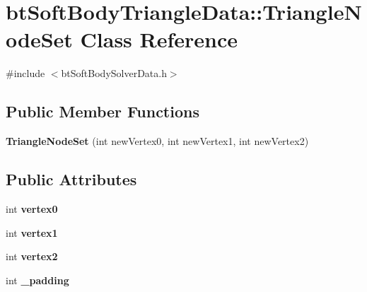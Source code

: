 \hypertarget{classbt_soft_body_triangle_data_1_1_triangle_node_set}{\section{bt\+Soft\+Body\+Triangle\+Data\+:\+:Triangle\+Node\+Set Class Reference}
\label{classbt_soft_body_triangle_data_1_1_triangle_node_set}
}


{\ttfamily \#include $<$bt\+Soft\+Body\+Solver\+Data.\+h$>$}

\subsection*{Public Member Functions}
\begin{DoxyCompactItemize}
\item 
\hypertarget{classbt_soft_body_triangle_data_1_1_triangle_node_set_a6a464df5e373dc8f072b40e43349d69b}{{\bfseries Triangle\+Node\+Set} (int new\+Vertex0, int new\+Vertex1, int new\+Vertex2)}\label{classbt_soft_body_triangle_data_1_1_triangle_node_set_a6a464df5e373dc8f072b40e43349d69b}

\end{DoxyCompactItemize}
\subsection*{Public Attributes}
\begin{DoxyCompactItemize}
\item 
\hypertarget{classbt_soft_body_triangle_data_1_1_triangle_node_set_ae327dfa7eb0f95a9eb748e5ab650fa67}{int {\bfseries vertex0}}\label{classbt_soft_body_triangle_data_1_1_triangle_node_set_ae327dfa7eb0f95a9eb748e5ab650fa67}

\item 
\hypertarget{classbt_soft_body_triangle_data_1_1_triangle_node_set_af627427de3ce716fd58e408efbd2bc8a}{int {\bfseries vertex1}}\label{classbt_soft_body_triangle_data_1_1_triangle_node_set_af627427de3ce716fd58e408efbd2bc8a}

\item 
\hypertarget{classbt_soft_body_triangle_data_1_1_triangle_node_set_a7f68be6c536c4bd9bc2863e2a8e15b90}{int {\bfseries vertex2}}\label{classbt_soft_body_triangle_data_1_1_triangle_node_set_a7f68be6c536c4bd9bc2863e2a8e15b90}

\item 
\hypertarget{classbt_soft_body_triangle_data_1_1_triangle_node_set_a08d49c73c1098c41f0bbc1b7d874b765}{int {\bfseries \+\_\+padding}}\label{classbt_soft_body_triangle_data_1_1_triangle_node_set_a08d49c73c1098c41f0bbc1b7d874b765}

\end{DoxyCompactItemize}


